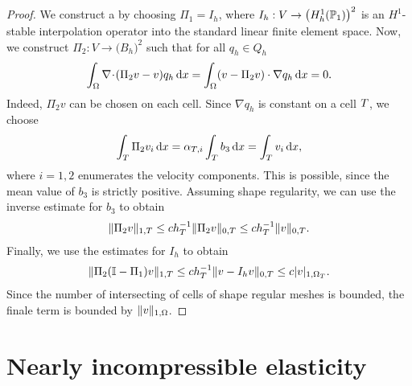 \begin{proof}
  We construct a  by choosing
  $\Pi_1 = I_h$, where $I_h:V\to \bigl(H^1_h(\P_1)\bigr)^2$ is an
  $H^1$-stable interpolation operator into the standard linear finite
  element space. Now, we construct $\Pi_2: V \to \bigl(B_h\bigr)^2$
  such that for all $q_h\in Q_h$
  \begin{gather*}
    \int_\domain \div(\Pi_2 v-v) q_h \dx
    = \int_\domain (v-\Pi_2v)\cdot\nabla q_h\dx
    = 0.
  \end{gather*}
  Indeed, $\Pi_2 v$ can be chosen on each cell. Since $\nabla q_h$ is
  constant on a cell $\cell$, we choose
  \begin{gather*}
    \int_\cell \Pi_2 v_i \dx
    = \alpha_{\cell,i} \int_\cell b_3\dx
    = \int_\cell v_i\dx,
  \end{gather*}
  where $i=1,2$ enumerates the velocity components. This is possible,
  since the mean value of $b_3$ is strictly positive. Assuming shape
  regularity, we can use the inverse estimate for $b_3$ to obtain
  \begin{gather*}
    \norm{\Pi_2 v}_{1,\cell}
    \le c h_\cell^{-1} \norm{\Pi_2 v}_{0,\cell}
    \le c h_\cell^{-1} \norm{v}_{0,\cell}.
  \end{gather*}
  Finally, we use the estimates for $I_h$ to obtain
  \begin{gather*}
    \norm{\Pi_2 (\identity-\Pi_1) v}_{1,\cell}
    \le c h_\cell^{-1} \norm{v-I_h v}_{0,\cell}
    \le c \snorm{v}_{1,\domain_\cell}.
  \end{gather*}
  Since the number of intersecting of cells of shape regular meshes is
  bounded, the finale term is bounded by $\norm v_{1,\domain}$.
\end{proof}
\section{Nearly incompressible elasticity}

